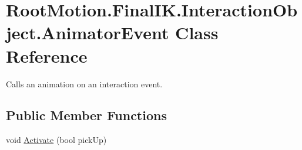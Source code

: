 \hypertarget{class_root_motion_1_1_final_i_k_1_1_interaction_object_1_1_animator_event}{}\section{Root\+Motion.\+Final\+I\+K.\+Interaction\+Object.\+Animator\+Event Class Reference}
\label{class_root_motion_1_1_final_i_k_1_1_interaction_object_1_1_animator_event}


Calls an animation on an interaction event.  


\subsection*{Public Member Functions}
\begin{DoxyCompactItemize}
\item 
void \mbox{\hyperlink{class_root_motion_1_1_final_i_k_1_1_interaction_object_1_1_animator_event_ad20c8d00e50eb54592dc4860202b4562}{Activate}} (bool pick\+Up)
\end{DoxyCompactItemize}
